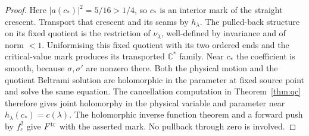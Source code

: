 \documentclass[11pt]{article}
\newcommand{\C}{\mathbb C}
\begin{document}
\begin{proof}
Here $|a(c_*)|^2=5/16>1/4$, so $c_*$ is an interior mark of the
straight crescent. Transport that crescent and its seams by $h_\lambda$.
The pulled-back structure on its fixed quotient is the restriction
of $\nu_\lambda$, well-defined by invariance and of norm $<1$.
Uniformising this fixed quotient with its two ordered ends and the
critical-value mark produces its transported $\C^*$ family.
Near $c_*$ the coefficient is smooth, because $\sigma,\sigma'$ are
nonzero there. Both the physical motion and the quotient Beltrami
solution are holomorphic in the parameter at fixed source point and
solve the same equation. The cancellation computation in
Theorem~\ref{thm:qc} therefore gives joint holomorphy in the physical
variable and parameter near $h_\lambda(c_*)=c(\lambda)$.
The holomorphic inverse function theorem and a forward push by $f_c^2$
give $F^{\rm tr}$ with the asserted mark. No pullback through zero
is involved.
\end{proof}
\end{document}
